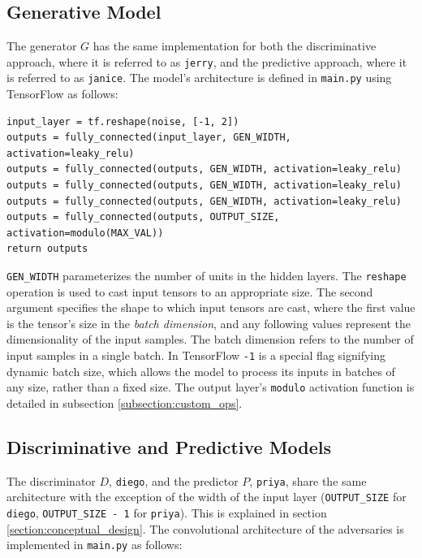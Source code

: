 \documentclass[12pt, titlepage]{report}
\theoremstyle{definition}
\begin{document}
\subsection{Generative Model}
The generator $G$ has the same implementation for both the discriminative approach, where it is referred to as \texttt{jerry}, and the predictive approach, where it is referred to as \texttt{janice}. The model's architecture is defined in \texttt{main.py} using TensorFlow as follows:

\begin{verbatim}
input_layer = tf.reshape(noise, [-1, 2])
outputs = fully_connected(input_layer, GEN_WIDTH, activation=leaky_relu)
outputs = fully_connected(outputs, GEN_WIDTH, activation=leaky_relu)
outputs = fully_connected(outputs, GEN_WIDTH, activation=leaky_relu)
outputs = fully_connected(outputs, GEN_WIDTH, activation=leaky_relu)
outputs = fully_connected(outputs, OUTPUT_SIZE, activation=modulo(MAX_VAL))
return outputs
\end{verbatim}

\texttt{GEN_WIDTH} parameterizes the number of units in the hidden layers. The \texttt{reshape} operation is used to cast input tensors to an appropriate size. The second argument specifies the shape to which input tensors are cast, where the first value is the tensor's size in the \textit{batch dimension}, and any following values represent the dimensionality of the input samples. The batch dimension refers to the number of input samples in a single batch. In TensorFlow \texttt{-1} is a special flag signifying dynamic batch size, which allows the model to process its inputs in batches of any size, rather than a fixed size. The output layer's \texttt{modulo} activation function is detailed in subsection \ref{subsection:custom_ops}.


\subsection{Discriminative and Predictive Models}
The discriminator $D$, \texttt{diego}, and the predictor $P$, \texttt{priya}, share the same architecture with the exception of the width of the input layer (\texttt{OUTPUT_SIZE} for \texttt{diego}, \texttt{OUTPUT_SIZE - 1} for \texttt{priya}). This is explained in section \ref{section:conceptual_design}. The convolutional architecture of the adversaries is implemented in \texttt{main.py} as follows:
\end{document}
